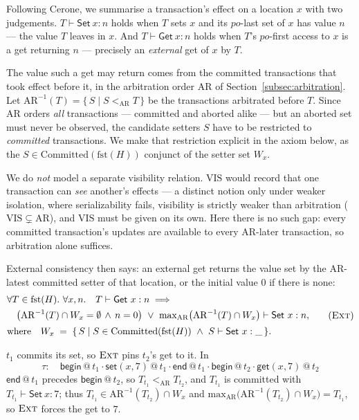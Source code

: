 \documentclass[manuscript,nonacm]{acmart}
\makeatletter
\theoremstyle{acmdefinition}
\newcommand{\bbegin}{\textsf{begin}}
\newcommand{\eend}{\textsf{end}}
\newcommand{\getev}[3]{\textsf{get}(#1,#2)\,@\,#3}
\newcommand{\setev}[3]{\textsf{set}(#1,#2)\,@\,#3}
\newcommand{\po}{\mathit{po}}
\newcommand{\fst}{\mathrm{fst}}             %
\makeatother
\begin{document}
Following Cerone, we summarise a transaction's effect on a location $x$ with two
judgements. $T \vdash \mathsf{Set}\ x : n$ holds when $T$ sets $x$ and its
$\po$-last set of $x$ has value $n$ --- the value $T$ leaves in $x$. And
$T \vdash \mathsf{Get}\ x : n$ holds when $T$'s $\po$-first access to $x$ is a get
returning $n$ --- precisely an \emph{external} get of $x$ by $T$.

The value such a get may return comes from the committed transactions that took
effect before it, in the arbitration order $\mathrm{AR}$ of
Section~\ref{subsec:arbitration}. Let $\mathrm{AR}^{-1}(T) = \{\, S \mid S <_{\mathrm{AR}} T \,\}$
be the transactions arbitrated before $T$. Since $\mathrm{AR}$ orders \emph{all}
transactions --- committed and aborted alike --- but an aborted set must never be
observed, the candidate setters $S$ have to be restricted to \emph{committed}
transactions. We make that restriction explicit in the axiom below, as the
$S \in \mathrm{Committed}(\fst(H))$ conjunct of the setter set $W_x$.

We do \emph{not} model a separate visibility relation. $\mathrm{VIS}$ would record
that one transaction can \emph{see} another's effects --- a distinct notion only
under weaker isolation, where serializability fails, visibility is strictly weaker
than arbitration ($\mathrm{VIS} \subsetneq \mathrm{AR}$), and $\mathrm{VIS}$ must be
given on its own. Here there is no such gap: every committed transaction's updates
are available to every $\mathrm{AR}$-later transaction, so arbitration alone
suffices.

External consistency then says: an external get returns the value set by the
$\mathrm{AR}$-latest committed setter of that location, or the initial value $0$ if
there is none:
\[
\begin{aligned}
&\forall T \in \fst(H).\ \forall x, n.\quad T \vdash \mathsf{Get}\ x : n \implies {}\\
&\quad \bigl(\mathrm{AR}^{-1}(T) \cap W_x = \emptyset \,\wedge\, n = 0\bigr)\ \vee\
       \mathrm{max}_{\mathrm{AR}}\bigl(\mathrm{AR}^{-1}(T) \cap W_x\bigr) \vdash \mathsf{Set}\ x : n,\\[2pt]
&\text{where}\quad W_x \;=\; \{\, S \mid S \in \mathrm{Committed}(\fst(H))\ \wedge\ S \vdash \mathsf{Set}\ x : \_ \,\}.
\end{aligned}
\tag{\textsc{Ext}}
\]

\begin{example}
$t_1$ commits its set, so $\textsc{Ext}$ pins $t_2$'s get to it. In
\[
\tau:\quad \bbegin\,@\,t_1 \cdot \setev{x}{7}{t_1} \cdot \eend\,@\,t_1
      \cdot \bbegin\,@\,t_2 \cdot \getev{x}{7}{t_2}
\]
$\eend\,@\,t_1$ precedes $\bbegin\,@\,t_2$, so $T_{t_1} <_{\mathrm{AR}} T_{t_2}$, and
$T_{t_1}$ is committed with $T_{t_1} \vdash \mathsf{Set}\ x : 7$; thus
$T_{t_1} \in \mathrm{AR}^{-1}(T_{t_2}) \cap W_x$ and
$\mathrm{max}_{\mathrm{AR}}\bigl(\mathrm{AR}^{-1}(T_{t_2}) \cap W_x\bigr) = T_{t_1}$,
so $\textsc{Ext}$ forces the get to $7$.
\end{example}
\end{document}
